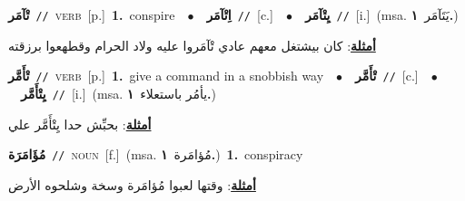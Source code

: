 \documentclass[10pt,a4paper,twoside]{article} %
\begin{document}
\begin{multicols}{2}
{\setlength\topsep{0pt}\textbf{\foreignlanguage{arabic}{تْآمَر}}\ {\color{gray}\texttt{//}\color{black}}\ \textsc{verb}\ [p.]\ \textbf{1.}~conspire\ \ $\bullet$\ \ \setlength\topsep{0pt}\textbf{\foreignlanguage{arabic}{اِتْآمَر}}\ {\color{gray}\texttt{//}\color{black}}\ [c.]\ \ $\bullet$\ \ \setlength\topsep{0pt}\textbf{\foreignlanguage{arabic}{يِتْآمَر}}\ {\color{gray}\texttt{//}\color{black}}\ [i.]\ \color{gray}(msa. \foreignlanguage{arabic}{يَتَآمَر}~\foreignlanguage{arabic}{\textbf{١.}})\color{black}\  \begin{flushright}\color{gray}\foreignlanguage{arabic}{\textbf{\underline{\foreignlanguage{arabic}{أمثلة}}}: كان بيشتغل معهم عادي تْآمَروا عليه ولاد الحرام وقطهعوا برزقته}\end{flushright}\color{black}} \vspace{2mm}

{\setlength\topsep{0pt}\textbf{\foreignlanguage{arabic}{تْأَمَّر}}\ {\color{gray}\texttt{//}\color{black}}\ \textsc{verb}\ [p.]\ \textbf{1.}~give a command in a snobbish way\ \ $\bullet$\ \ \setlength\topsep{0pt}\textbf{\foreignlanguage{arabic}{تْأَمَّر}}\ {\color{gray}\texttt{//}\color{black}}\ [c.]\ \ $\bullet$\ \ \setlength\topsep{0pt}\textbf{\foreignlanguage{arabic}{يِتْأَمَّر}}\ {\color{gray}\texttt{//}\color{black}}\ [i.]\ \color{gray}(msa. \foreignlanguage{arabic}{يأمُر باستعلاء}~\foreignlanguage{arabic}{\textbf{١.}})\color{black}\  \begin{flushright}\color{gray}\foreignlanguage{arabic}{\textbf{\underline{\foreignlanguage{arabic}{أمثلة}}}: بحبِّش حدا يِتْأَمَّر علي}\end{flushright}\color{black}} \vspace{2mm}

{\setlength\topsep{0pt}\textbf{\foreignlanguage{arabic}{مُؤَامَرَة}}\ {\color{gray}\texttt{//}\color{black}}\ \textsc{noun}\ [f.]\ \color{gray}(msa. \foreignlanguage{arabic}{مُؤامَرة}~\foreignlanguage{arabic}{\textbf{١.}})\color{black}\ \textbf{1.}~conspiracy\  \begin{flushright}\color{gray}\foreignlanguage{arabic}{\textbf{\underline{\foreignlanguage{arabic}{أمثلة}}}: وقتها لعبوا مُؤامَرة وسخة وشلحوه الأرض}\end{flushright}\color{black}} \vspace{2mm}


\end{multicols}
\end{document}

